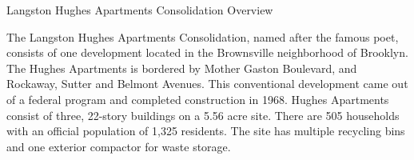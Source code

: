 Langston Hughes Apartments Consolidation Overview

The Langston Hughes Apartments Consolidation, named after the famous poet, consists of one development located in the Brownsville neighborhood of Brooklyn. The Hughes Apartments is bordered by Mother Gaston Boulevard, and Rockaway, Sutter and Belmont Avenues. This conventional development came out of a federal program and completed construction in 1968. Hughes Apartments consist of three, 22-story buildings on a 5.56 acre site. There are 505 households with an official population of 1,325 residents. The site has multiple recycling bins and one exterior compactor for waste storage.
